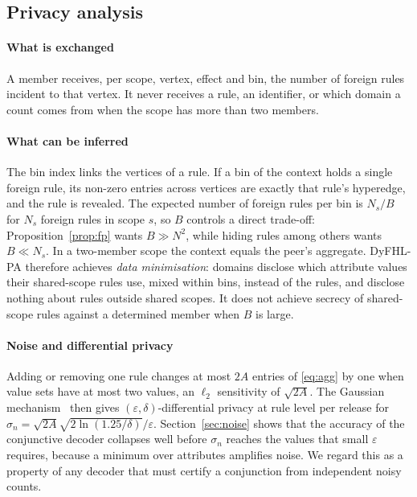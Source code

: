 \documentclass[preprint,12pt]{elsarticle}
\theoremstyle{definition}
\newcommand{\name}{DyFHL-PA\xspace}
\begin{document}
\subsection{Privacy analysis}
\label{sec:privacy}
\paragraph{What is exchanged} A member receives, per scope, vertex, effect and bin, the number of foreign rules incident to that vertex. It never receives a rule, an identifier, or which domain a count comes from when the scope has more than two members.

\paragraph{What can be inferred} The bin index links the vertices of a rule. If a bin of the context holds a single foreign rule, its non-zero entries across vertices are exactly that rule's hyperedge, and the rule is revealed. The expected number of foreign rules per bin is $N_s/B$ for $N_s$ foreign rules in scope $s$, so $B$ controls a direct trade-off: Proposition~\ref{prop:fp} wants $B\gg N^2$, while hiding rules among others wants $B\ll N_s$. In a two-member scope the context equals the peer's aggregate. \name therefore achieves \emph{data minimisation}: domains disclose which attribute values their shared-scope rules use, mixed within bins, instead of the rules, and disclose nothing about rules outside shared scopes. It does not achieve secrecy of shared-scope rules against a determined member when $B$ is large.

\paragraph{Noise and differential privacy} Adding or removing one rule changes at most $2A$ entries of \eqref{eq:agg} by one when value sets have at most two values, an $\ell_2$ sensitivity of $\sqrt{2A}$. The Gaussian mechanism~\cite{dwork2014algorithmic} then gives $(\varepsilon,\delta)$-differential privacy at rule level per release for $\sigma_{\!n}=\sqrt{2A}\sqrt{2\ln(1.25/\delta)}/\varepsilon$. Section~\ref{sec:noise} shows that the accuracy of the conjunctive decoder collapses well before $\sigma_{\!n}$ reaches the values that small $\varepsilon$ requires, because a minimum over attributes amplifies noise. We regard this as a property of any decoder that must certify a conjunction from independent noisy counts.
\end{document}
